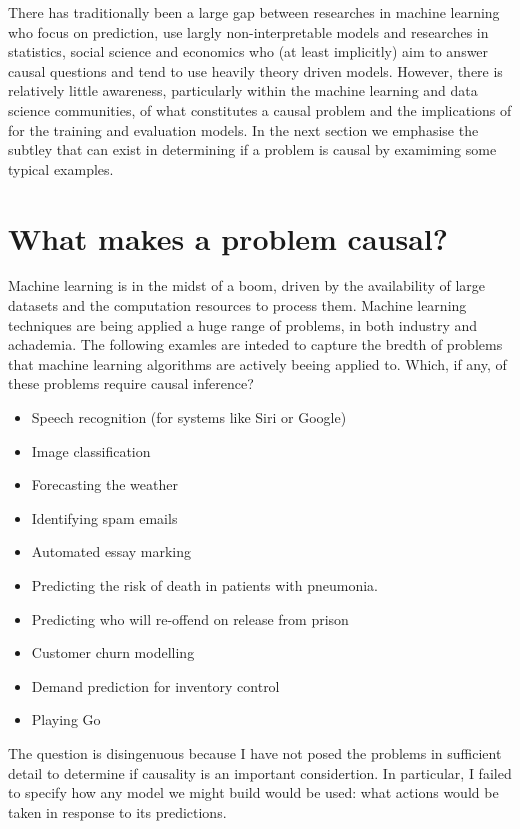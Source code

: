 \documentclass[11pt,a4paper,oneside]{book}
\theoremstyle{plain}
\theoremstyle{definition}
\begin{document}
There has traditionally been a large gap between researches in machine learning who focus on prediction, use largly non-interpretable models and researches in statistics, social science and economics who (at least implicitly) aim to answer causal questions and tend to use heavily theory driven models. However, there is relatively little awareness, particularly within the machine learning and data science communities, of what constitutes a causal problem and the implications of for the training and evaluation models. In the next section we emphasise the subtley that can exist in determining if a problem is causal by examiming some typical examples. 

\section{What makes a problem causal?}

Machine learning is in the midst of a boom, driven by the availability of large datasets and the computation resources to process them. Machine learning techniques are being applied a huge range of problems, in both industry and achademia. The following examles are inteded to capture the bredth of problems that machine learning algorithms are actively beeing applied to. Which, if any, of these problems require causal inference? 

\begin{itemize}
\item Speech recognition (for systems like Siri or Google)
\item Image classification
\item Forecasting the weather
\item Identifying spam emails
\item Automated essay marking
\item Predicting the risk of death in patients with pneumonia.
\item Predicting who will re-offend on release from prison 
\item Customer churn modelling
\item Demand prediction for inventory control
\item Playing Go 
\end{itemize}

The question is disingenuous because I have not posed the problems in sufficient detail to determine if causality is an important considertion. In particular, I failed to specify how any model we might build would be used: what actions would be taken in response to its predictions. 
\end{document}
